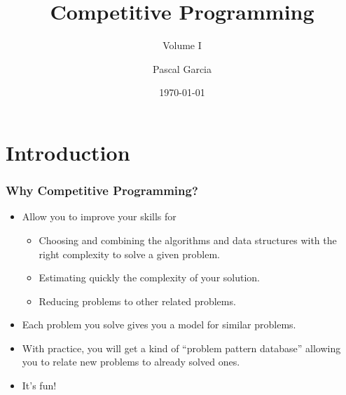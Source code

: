 \documentclass{beamer}
\title{Competitive Programming}
\subtitle{Volume I}
\author{Pascal Garcia}
\institute{}
\date{\today}
\begin{document}

\frame{\titlepage}


\begin{frame}[allowframebreaks]
  \scriptsize
  \vspace{0.1cm}
  \tableofcontents
\end{frame}

\section{Introduction}

\begin{frame}%
\frametitle{Why Competitive Programming?}


\begin{itemize}

\item Allow you to improve your skills for
\begin{itemize}

\item<1-> Choosing and combining the algorithms and data structures with the right complexity to solve a given problem.

\vspace{0.08cm}

\item<1-> Estimating quickly the complexity of your solution.

\vspace{0.08cm}

\item<1-> Reducing problems to other related problems.

\end{itemize}

\vspace{0.2cm}

\item<2-> Each problem you solve gives you a model for similar problems.

\vspace{0.2cm}

\item<3-> With practice, you will get a kind of ``problem pattern database''
allowing you to relate new problems to already solved ones.

\vspace{0.2cm}

\item<4-> It's fun!

\end{itemize}

\end{frame}
\end{document}
